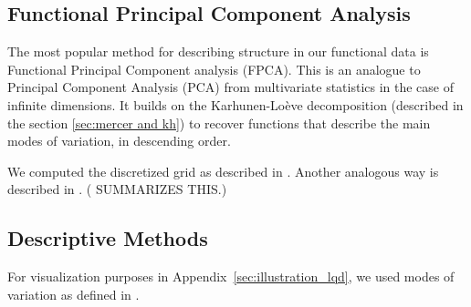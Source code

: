 \subsection{Functional Principal Component Analysis}
\label{sec:fpca}
The most popular method for describing structure in our functional data is Functional
Principal Component analysis (FPCA). This is an analogue to Principal Component Analysis
(PCA) from multivariate statistics in the case of infinite dimensions. It builds on the
Karhunen-Loève decomposition (described in the section \ref{sec:mercer and kh}) to
recover functions that describe the main modes of variation, in descending order.

We computed the discretized grid as described in \citet[Chapter~8.4.1]{RamsaySilverman2005}. Another analogous way
is described in \textcite{KneipUtikal2001}. (\textcite{Delicado2011} SUMMARIZES THIS.)

\subsection{Descriptive Methods}
\label{sec:fda_descriptives}
For visualization purposes in Appendix~\ref{sec:illustration_lqd}, we used modes of
variation as defined in \textcite{Castro1986}.

